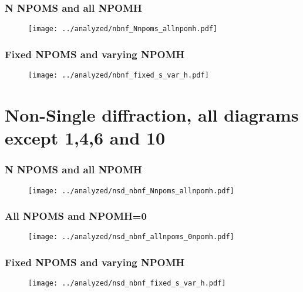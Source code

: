 \documentclass[]{article}
\begin{document}
\newpage
\subsubsection*{\centering N NPOMS and all NPOMH}

\begin{figure}[h!]
\centering
\texttt{[image: ../analyzed/nbnf\_Nnpoms\_allnpomh.pdf]}
    \label{fig1}
    \caption[N NPOMS and all NPOMH]{}
\end{figure}

\newpage
\subsubsection*{\centering Fixed NPOMS and varying NPOMH}

\begin{figure}[h!]
    \centering
    \texttt{[image: ../analyzed/nbnf\_fixed\_s\_var\_h.pdf]}
    \caption[Fixed NPOMS and varying NPOMH]{}
\end{figure}

\newpage

\section*{\centering Non-Single diffraction, all diagrams except 1,4,6 and 10}

\subsubsection*{\centering N NPOMS and all NPOMH}
\begin{figure}[h!]
\centering
\texttt{[image: ../analyzed/nsd\_nbnf\_Nnpoms\_allnpomh.pdf]}
    \caption[NSD All NPOMS and NPOMH=0]{}
\end{figure}

\newpage
\subsubsection*{\centering All NPOMS and NPOMH=0}

\begin{figure}[h!]
    \centering
\texttt{[image: ../analyzed/nsd\_nbnf\_allnpoms\_0npomh.pdf]}
    \caption[NSD N NPOMS and all NPOMH]{}
\end{figure}

\newpage
\subsubsection*{\centering Fixed NPOMS and varying NPOMH}

\begin{figure}[h!]
    \centering
    \texttt{[image: ../analyzed/nsd\_nbnf\_fixed\_s\_var\_h.pdf]}
    \caption[NSD Fixed NPOMS and varying NPOMH]{}
\end{figure}
\end{document}
